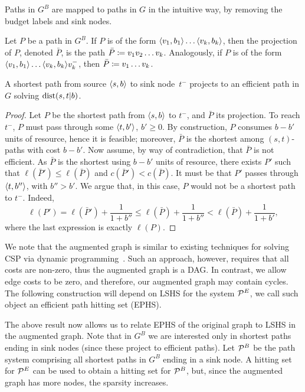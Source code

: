 Paths in $G^B$ are mapped to paths in $G$ in the intuitive way, by removing the budget labels and sink nodes.
\begin{definition}
	Let $P$ be a path in $G^B$.
	If $P$ is of the form $\langle v_1,b_1\rangle\ldots\langle v_k,b_k\rangle$, then the projection of $P$, denoted $\bar P$, is the path $\bar P\coloneqq v_1v_2\ldots v_k$.
	Analogously, if $P$ is of the form $\langle v_1,b_1\rangle\ldots\langle v_k,b_k\rangle v_{k}^-$, then $\bar P\coloneqq v_1\ldots v_{k}$. 
\end{definition}


\begin{proposition}\label{prop:shorteffic}
	A shortest path from source $\langle s,b\rangle$ to sink node~$t^-$ projects to an efficient path in $G$ solving $\mbox{dist}(s,t|b)$. 
\end{proposition}
\begin{proof}
	Let $P$ be the shortest path from $\langle s,b\rangle$ to $t^-$, and $\bar P$ its projection.
	To reach $t^-$, $P$ must pass through some $\langle t,b'\rangle$, $b'\geq 0$.
	By construction, $P$ consumes $b-b'$ units of resource, hence it is feasible; moreover, $\bar P$ is the shortest among $(s,t)$-paths with cost $b-b'$.
	Now assume, by way of contradiction, that $\bar P$ is not efficient.
	As $\bar P$ is the shortest using $b-b'$ units of resource, there exists $P'$ such that $\ell(\bar P')\leq \ell(\bar P)$ and $c(\bar P')< c(\bar P)$.
	It must be that $P'$ passes through $\langle t,b''\rangle$, with $b''>b'$.
	We argue that, in this case, $P$ would not be a shortest path to $t^-$.
	Indeed, 
	\[
	\ell(P')=\ell(\bar P')+\frac{1}{1+b''}
	\leq \ell(\bar P) +\frac{1}{1+b''}
	< \ell(\bar P) +\frac{1}{1+b'},
	\]
	where the last expression is exactly $\ell(P)$.
\end{proof}

We note that the augmented graph is similar to existing techniques for solving CSP via dynamic programming~\cite{alex_bicriteria}.
Such an approach, however, requires that all costs are non-zero, thus the augmented graph is a DAG.
In contrast, we allow edge costs to be zero, and therefore, our augmented graph may contain cycles. 
The following construction will depend on LSHS for the system $\mathcal{P}^E$, we call such object an efficient path hitting set (EPHS).

The above result now allows us to relate EPHS of the original graph to LSHS in the augmented graph.
Note that in $G^B$ we are interested only in shortest paths ending in sink nodes (since these project to efficient paths). 
Let $\mathcal{P}^B$ be the path system comprising all shortest paths in $G^B$ ending in a sink node.
A hitting set for $\mathcal{P}^E$ can be used to obtain a hitting set for $\mathcal{P}^B$, but, since the augmented graph has more nodes, the sparsity increases.

